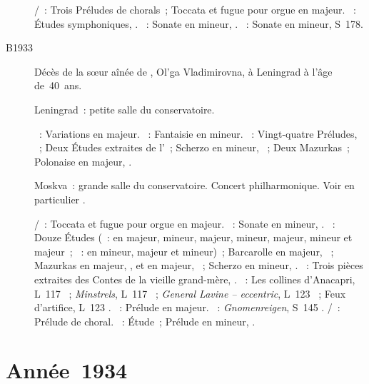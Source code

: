 \begin{description}
 \textsc{\JBach{}/\Busoni{}}~: Trois Préludes de chorals~; Toccata et fugue
 pour orgue en \kC majeur.
 \textsc{\Schumann{}}~: Études symphoniques, .
 \textsc{\Beethoven{}}~: Sonate en \kC \Sharp mineur,  .
 \textsc{\Liszt{}}~: Sonate en \kB mineur, S~178.
 \item[B1933]
 Décès de la sœur aînée de \VSofronitsky{}, Ol'ga Vladimirovna, à Leningrad
 à l'âge de~40~ans.
 \item[\DateWithWeekDay{1933-12-23}]
 Leningrad~: petite salle du conservatoire.

 \textsc{\Haendel{}}~: Variations en \kE majeur.
 \textsc{\Mozart{}}~: Fantaisie en \kC mineur.
 \textsc{\Chopin{}}~: Vingt-quatre Préludes, ~; Deux Études
 extraites de l'~; Scherzo en \kC \Sharp mineur, ~; Deux
 Mazurkas~; Polonaise en \kA \Flat majeur, .
 \item[\DateWithWeekDay{1933-12-25}]
 Moskva~: grande salle du conservatoire.
 Concert philharmonique.
 Voir en particulier \citet[p.~427]{Milshteyn82a}.

 \textsc{\JBach{}/\Busoni{}}~: Toccata et fugue pour orgue en \kC majeur.
 \textsc{\Beethoven{}}~: Sonate en \kC \Sharp mineur,  .
 \textsc{\Chopin{}}~: Douze Études (~: en \kC majeur, \kA mineur,
 \kE majeur, \kC \Sharp mineur, \kG \Flat majeur, \kE \Flat mineur et \kF
 majeur~; ~: en \kF mineur, \kF majeur et \kC mineur)~; Barcarolle
 en \kF \Sharp majeur, ~; Mazurkas en \kD majeur, 
 , et en \kB majeur,  ~; Scherzo en \kB \Flat
 mineur, .
 \textsc{\Prokofiev{}}~: Trois pièces extraites des Contes de la vieille
 grand-mère, .
 \textsc{\Debussy{}}~: Les collines d'\hbox{Anacapri}, L~117 ~;
 \emph{Minstrels}, L~117 ~; \emph{General Lavine -- eccentric},
 L~123 ~; Feux d'artifice, L~123 .
 \textsc{\Rachmaninov{}}~: Prélude en \kG majeur.
 \textsc{\Liszt{}}~: \emph{Gnomenreigen}, S~145 .
 \textsc{\JBach{}/\Busoni{}}~: Prélude de choral.
 \textsc{\Chopin{}}~: Étude~; Prélude en \kD mineur,  .
\end{description}

\section{Année~1934}

